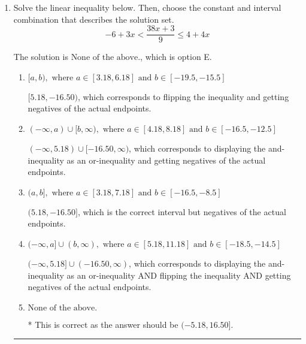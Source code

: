 \documentclass{extbook}[14pt]
\newcommand{\litem}[1]{\item #1

\rule{\textwidth}{0.4pt}}
\begin{document}
\begin{enumerate}
{\begin{enumerate}[label=\Alph*.]
This describes the values more than 2 from -7
\item \( (-\infty, -9] \cup [-5, \infty) \)

This describes the values no less than 2 from -7
\item \( [-9, -5] \)

This describes the values no more than 2 from -7
\item \( \text{None of the above} \)

You likely thought the values in the interval were not correct.
\end{enumerate}

\textbf{General Comment:} When thinking about this language, it helps to draw a number line and try points.
}
\litem{
Solve the linear inequality below. Then, choose the constant and interval combination that describes the solution set.
\[ -6 + 3 x < \frac{38 x + 3}{9} \leq 4 + 4 x \]

The solution is \( \text{None of the above.} \), which is option E.\begin{enumerate}[label=\Alph*.]
\item \( [a, b), \text{ where } a \in [3.18, 6.18] \text{ and } b \in [-19.5, -15.5] \)

$[5.18, -16.50)$, which corresponds to flipping the inequality and getting negatives of the actual endpoints.
\item \( (-\infty, a) \cup [b, \infty), \text{ where } a \in [4.18, 8.18] \text{ and } b \in [-16.5, -12.5] \)

$(-\infty, 5.18) \cup [-16.50, \infty)$, which corresponds to displaying the and-inequality as an or-inequality and getting negatives of the actual endpoints.
\item \( (a, b], \text{ where } a \in [3.18, 7.18] \text{ and } b \in [-16.5, -8.5] \)

$(5.18, -16.50]$, which is the correct interval but negatives of the actual endpoints.
\item \( (-\infty, a] \cup (b, \infty), \text{ where } a \in [5.18, 11.18] \text{ and } b \in [-18.5, -14.5] \)

$(-\infty, 5.18] \cup (-16.50, \infty)$, which corresponds to displaying the and-inequality as an or-inequality AND flipping the inequality AND getting negatives of the actual endpoints.
\item \( \text{None of the above.} \)

* This is correct as the answer should be $(-5.18, 16.50]$.
\end{enumerate}

}
\end{enumerate}
\end{document}
